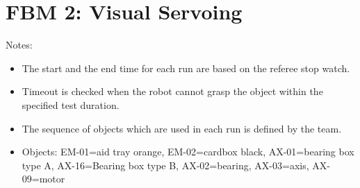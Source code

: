 \section*{FBM 2: Visual Servoing}


\noindent Notes:
\begin{itemize}
\item The start and the end time for each run are based on the referee stop watch.
\item Timeout is checked when the robot cannot grasp the object within the specified test duration.
\item The sequence of objects which are used in each run is defined by the team.
\item Objects: EM-01=aid tray orange, EM-02=cardbox black, AX-01=bearing box type A, AX-16=Bearing box type B, AX-02=bearing, AX-03=axis, AX-09=motor
\end{itemize}

\vspace{0.5cm}


\newpage


